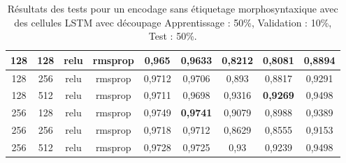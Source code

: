 \begin{table}[H]
{\begin{tabular}{|c|c|c|c|c|c|c|c|c|}
				128 & 128 & relu & rmsprop & 0,965 & 0,9633 & 0,8212 & 0,8081 & 0,8894 \\ \hline
				128 & 256 & relu & rmsprop & 0,9712 & 0,9706 & 0,893 & 0,8817 & 0,9291 \\ \hline
				128 & 512 & relu & rmsprop & 0,9711 & 0,9698 & 0,9316 & \textbf{0,9269} & 0,9498 \\ \hline
				256 & 128 & relu & rmsprop & 0,9749 & \textbf{0,9741} & 0,9079 & 0,8988 & 0,9389 \\ \hline
				256 & 256 & relu & rmsprop & 0,9718 & 0,9712 & 0,8629 & 0,8555 & 0,9153 \\ \hline
				256 & 512 & relu & rmsprop & 0,9728 & 0,9725 & 0,93 & 0,9239 & 0,9498 \\ \hline
			\end{tabular}%
		}
		\caption{Résultats des tests pour un encodage sans étiquetage morphosyntaxique avec des cellules LSTM avec découpage Apprentissage : 50\%, Validation : 10\%, Test : 50\%.}
		\label{tab:lstm_2}
	\end{table}
	
